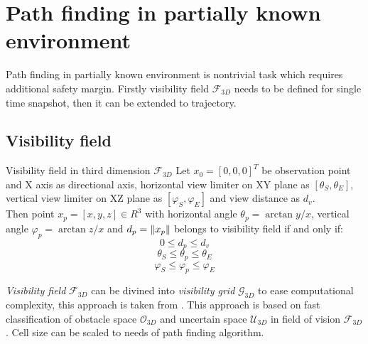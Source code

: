 \newpage
\section{Path finding in partially known environment}
\noindent Path finding in partially known environment is nontrivial task which requires additional safety margin. Firstly visibility field $\mathscr{F}_{3D}$ needs to be defined for single time snapshot, then it can be extended to trajectory.
\subsection{Visibility field}
\begin{definition}{Visibility field in third dimension $\mathscr{F}_{3D}$}\label{def:VisibleSpace}
    Let $x_0=[0,0,0]^T$ be observation point and X axis as directional axis, horizontal view limiter on XY plane as $[\theta_S,\theta_E]$, vertical view limiter on XZ plane as $[\varphi_S,\varphi_E]$ and view distance as $d_v$.
    \\
    Then point $x_p=[x,y,z]\in R^3$ with horizontal angle $\theta_p = \arctan y/x$, vertical angle $\varphi_p=\arctan z/x$  and $d_p=\left\lVert x_p\right\rVert$ belongs to visibility field if and only if:
    \begin{equation}
        0 \le d_p \le d_v
    \end{equation}
    \begin{equation}
        \theta_S \le \theta_p \le \theta_E
    \end{equation}
    \begin{equation}
        \varphi_S \le \varphi_p \le \varphi_E
    \end{equation}
\end{definition}
\noindent\textit{Visibility field} $\mathscr{F}_{3D}$ can be divined into \textit{visibility grid} $\mathscr{G}_{3D}$ to ease computational complexity, this approach is taken from \cite{goerzen2010survey}. This approach is based on fast classification of obstacle space $\mathscr{O}_{3D}$ and uncertain space $\mathscr{U}_{3D}$ in field of vision $\mathscr{F}_{3D}$. Cell size can be scaled to needs of path finding algorithm.
